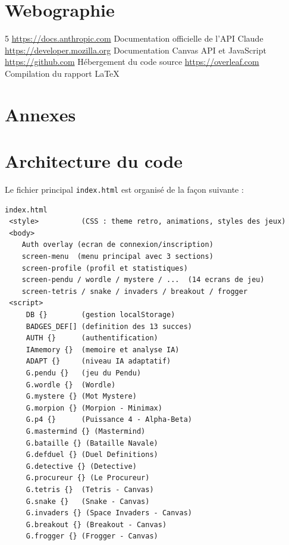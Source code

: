 \documentclass[a4paper, 12pt, twoside]{article}
\begin{document}
\section{Webographie}

\begin{thebibliography}{5}
   \url{https://docs.anthropic.com}  Documentation officielle de l'API Claude
   \url{https://developer.mozilla.org}  Documentation Canvas API et JavaScript
   \url{https://github.com}  Hébergement du code source
   \url{https://overleaf.com}  Compilation du rapport \LaTeX
\end{thebibliography}

\newpage

\section*{Annexes}
\appendix
\makeatletter
\def\@seccntformat#1{Annexe~\csname the#1\endcsname:\quad}
\makeatother

\section{Architecture du code}

Le fichier principal \texttt{index.html} est organisé de la façon suivante :

\begin{lstlisting}[caption=Structure du fichier index.html]
index.html
 <style>          (CSS : theme retro, animations, styles des jeux)
 <body>
    Auth overlay (ecran de connexion/inscription)
    screen-menu  (menu principal avec 3 sections)
    screen-profile (profil et statistiques)
    screen-pendu / wordle / mystere / ...  (14 ecrans de jeu)
    screen-tetris / snake / invaders / breakout / frogger
 <script>
     DB {}        (gestion localStorage)
     BADGES_DEF[] (definition des 13 succes)
     AUTH {}      (authentification)
     IAmemory {}  (memoire et analyse IA)
     ADAPT {}     (niveau IA adaptatif)
     G.pendu {}   (jeu du Pendu)
     G.wordle {}  (Wordle)
     G.mystere {} (Mot Mystere)
     G.morpion {} (Morpion - Minimax)
     G.p4 {}      (Puissance 4 - Alpha-Beta)
     G.mastermind {} (Mastermind)
     G.bataille {} (Bataille Navale)
     G.defduel {} (Duel Definitions)
     G.detective {} (Detective)
     G.procureur {} (Le Procureur)
     G.tetris {}  (Tetris - Canvas)
     G.snake {}   (Snake - Canvas)
     G.invaders {} (Space Invaders - Canvas)
     G.breakout {} (Breakout - Canvas)
     G.frogger {} (Frogger - Canvas)
\end{lstlisting}
\end{document}
